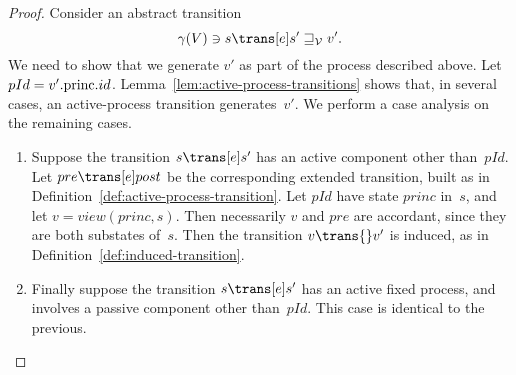 \begin{proof} 
Consider an abstract transition
\[
\gamma(V) \ni s \trans[e] s' \sqge_{\V} v'.
\]
We need to show that we generate $v'$ as part of the process described above.
%
Let $pId = v'.\mathrm{princ}.id$.
%
Lemma~\ref{lem:active-process-transitions} shows that, in several cases, an
active-process transition generates~$v'$. 
%
We perform a case analysis on the remaining cases.
%
\begin{enumerate}

\item
Suppose the transition $s \trans[e] s'$ has an active component other
than~$pId$.  Let $pre \trans[e] post$ be the corresponding extended
transition, built as in Definition~\ref{def:active-process-transition}.  Let
$pId$ have state $princ$ in~$s$, and let
$v = view(princ, s)$.  Then necessarily $v$ and $pre$ are accordant, since
they are both substates of~$s$.  Then the transition $v \trans{} v'$ is
induced, as in Definition~\ref{def:induced-transition}.

\item\label{step:abs-trans-correct-3}
Finally suppose the transition $s \trans[e] s'$ has an active fixed process,
and involves a passive component other than~$pId$.  This case is identical to
the previous.
\end{enumerate}
\end{proof}

